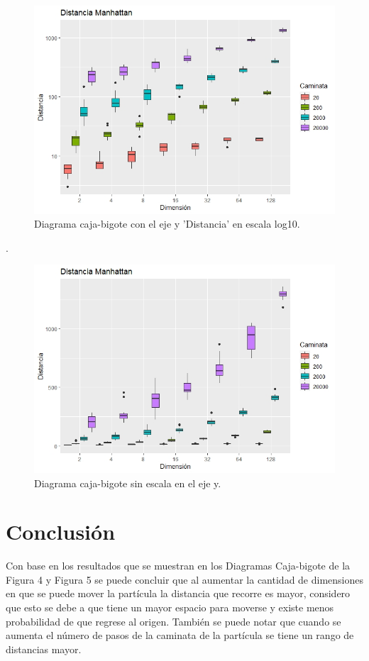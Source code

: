 \documentclass{article}
\begin{document}
\begin{figure}[h!]%
    \centering
    \includegraphics[width=170mm]{Figura4.jpeg} %
    \caption{Diagrama caja-bigote con el eje y 'Distancia' en escala log10.}
    \label{Figura4}
\end{figure}

\newpage
.
\bigskip
\bigskip

\begin{figure}[h!]%
    \centering
    \includegraphics[width=170mm]{Figura5.jpeg} %
    \caption{Diagrama caja-bigote sin escala en el eje y.}
    \label{Figura5}
\end{figure}

\bigskip

\section{Conclusi\'{o}n}
Con base en los resultados que se muestran en los Diagramas Caja-bigote de la Figura 4 y Figura 5 se puede concluir que al aumentar la cantidad de dimensiones en que se puede mover la partícula la distancia que recorre es mayor, considero que esto se debe a que tiene un mayor espacio para moverse y existe menos probabilidad de que regrese al origen. También se puede notar que cuando se aumenta el número de pasos de la caminata de la partícula se tiene un rango de distancias mayor.
\end{document}
